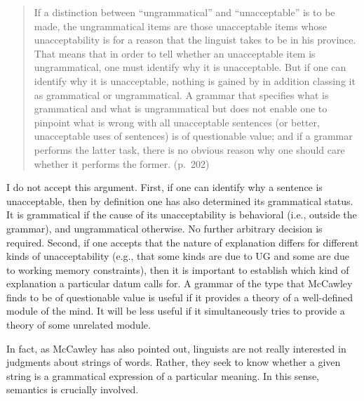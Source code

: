 \begin{quote}
If a distinction between ``ungrammatical'' and ``unacceptable'' is to be made, the ungrammatical items are those unacceptable items whose unacceptability is for a reason that the linguist takes to be in his province. That means that in order to tell whether an unacceptable item is ungrammatical, one must identify why it is unacceptable. But if one can identify why it is unacceptable, nothing is gained by in addition classing it as grammatical or ungrammatical. A grammar that specifies what is grammatical and what is ungrammatical but does not enable one to pinpoint what is wrong with all unacceptable sentences (or better, unacceptable uses of sentences) is of questionable value; and if a grammar performs the latter task, there is no obvious reason why one should care whether it performs the former. (p.~202)
\end{quote}

\noindent
I do not accept this argument. First, if one can identify why a sentence is unacceptable, then by definition one has also determined its grammatical status. It is grammatical if the cause of its unacceptability is behavioral (i.e., outside the grammar), and ungrammatical otherwise. No further arbitrary decision is required. Second, if one accepts that the nature of explanation differs for different kinds of unacceptability (e.g., that some kinds are due to UG and some are due to working memory constraints), then it is important to establish which kind of explanation a particular datum calls for. A grammar of the type that McCawley finds to be of questionable value is useful if it provides a theory of a well-defined module of the mind. It will be less useful if it simultaneously tries to provide a theory of some unrelated module.

In fact, as McCawley has also pointed out, linguists are not really interested
in judgments about strings of words. Rather, they seek to know whether a given string is a grammatical expression of a particular meaning. In this sense, semantics is crucially involved.

